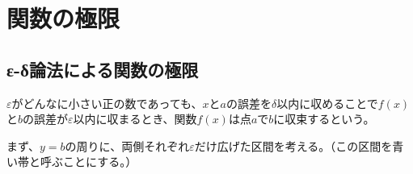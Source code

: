 \documentclass[../../imaging-math]{subfiles}
\begin{document}
\section{関数の極限}

\subsection{ε-δ論法による関数の極限}

$\varepsilon$がどんなに小さい正の数であっても、$x$と$a$の誤差を$\delta$以内に収めることで$f(x)$と$b$の誤差が$\varepsilon$以内に収まるとき、関数$f(x)$は点$a$で$b$に収束するという。

\froufrou

まず、$y=b$の周りに、両側それぞれ$\varepsilon$だけ広げた区間を考える。（この区間を青い帯と呼ぶことにする。）
\end{document}
